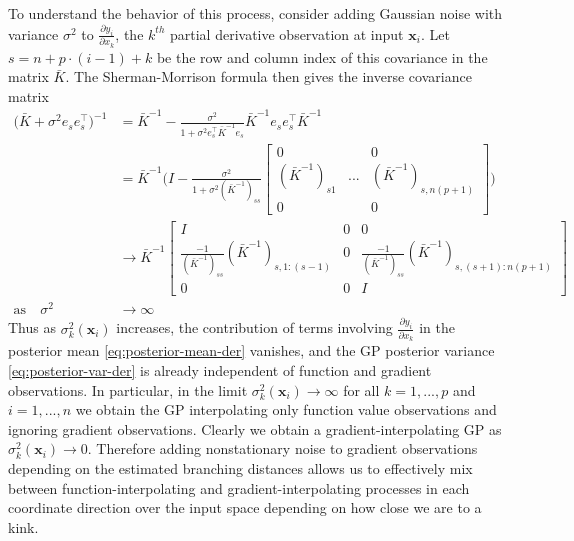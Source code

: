 \documentclass{article}
\newcommand{\mat}[1]{\begin{bmatrix}#1\end{bmatrix}}
\renewcommand{\vec}[1]{\mathbf{#1}}
\numberwithin{equation}{section}
\begin{document}
To understand the behavior of this process, consider adding Gaussian noise with variance $\sigma^2$ to $\frac{\partial y_i}{\partial x_k}$, the $k^{th}$ partial derivative observation at input $\vec{x}_i$. Let $s = n + p \cdot (i-1) + k$ be the row and column index of this covariance in the matrix $\bar{K}$. The Sherman-Morrison formula then gives the inverse covariance matrix
\begin{align*}
  \Big(\bar{K} + \sigma^2 e_s e_s^\top\Big)^{-1}
  & = \bar{K}^{-1} - \frac{\sigma^2}{1 + \sigma^2 e_s^\top \bar{K}^{-1} e_s} \bar{K}^{-1} e_s e_s^\top \bar{K}^{-1} \\
  & = \bar{K}^{-1} \Bigg(I - \frac{\sigma^2}{1 + \sigma^2 (\bar{K}^{-1})_{ss}} \mat{0 & & 0 \\ (\bar{K}^{-1})_{s1} & ... & (\bar{K}^{-1})_{s,n(p+1)} \\ 0 & & 0} \Bigg) \\
  & \to \bar{K}^{-1} \mat{ I & 0 & 0 \\ \frac{-1}{(\bar{K}^{-1})_{ss}}(\bar{K}^{-1})_{s,1:(s-1)} & 0 & \frac{-1}{(\bar{K}^{-1})_{ss}}(\bar{K}^{-1})_{s,(s+1):n(p+1)} \\ 0 & 0 & I } \\
  \text{as} \quad \sigma^2 & \to \infty
\end{align*}
Thus as $\sigma^2_k(\vec{x}_i)$ increases, the contribution of terms involving $\frac{\partial y_i}{\partial x_k}$ in the posterior mean \eqref{eq:posterior-mean-der} vanishes, and the GP posterior variance \eqref{eq:posterior-var-der} is already independent of function and gradient observations. In particular, in the limit $\sigma^2_k(\vec{x}_i) \to \infty$
for all $k=1,...,p$ and $i=1,...,n$ we obtain the GP interpolating only function value observations and ignoring gradient observations. Clearly we obtain a gradient-interpolating GP as $\sigma^2_k(\vec{x}_i) \to 0$. Therefore adding nonstationary noise to gradient observations depending on the estimated branching distances allows us to effectively mix between function-interpolating and gradient-interpolating processes in each coordinate direction over the input space depending on how close we are to a kink.
\end{document}
